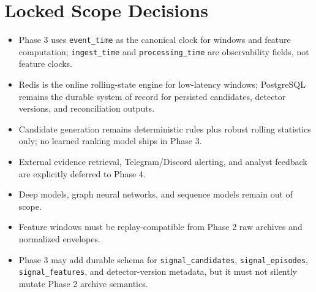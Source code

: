 \documentclass{article}
\begin{document}
\section*{Locked Scope Decisions}
\begin{itemize}
\item Phase 3 uses \texttt{event\_time} as the canonical clock for windows and feature computation; \texttt{ingest\_time} and \texttt{processing\_time} are observability fields, not feature clocks.
\item Redis is the online rolling-state engine for low-latency windows; PostgreSQL remains the durable system of record for persisted candidates, detector versions, and reconciliation outputs.
\item Candidate generation remains deterministic rules plus robust rolling statistics only; no learned ranking model ships in Phase 3.
\item External evidence retrieval, Telegram/Discord alerting, and analyst feedback are explicitly deferred to Phase 4.
\item Deep models, graph neural networks, and sequence models remain out of scope.
\item Feature windows must be replay-compatible from Phase 2 raw archives and normalized envelopes.
\item Phase 3 may add durable schema for \texttt{signal\_candidates}, \texttt{signal\_episodes}, \texttt{signal\_features}, and detector-version metadata, but it must not silently mutate Phase 2 archive semantics.
\end{itemize}
\end{document}
